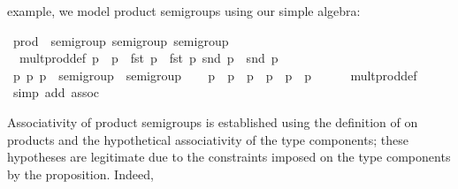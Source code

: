 \begin{isabellebody}
\begin{isamarkuptext}
  example, we model product semigroups using our simple algebra:%
\end{isamarkuptext}%
\isamarkuptrue%
%
\isadelimquote
%
\endisadelimquote
%
\isatagquote
{}\isamarkupfalse%
\ prod\ {\isacharcolon}{\isacharcolon}\ {\isacharparenleft}semigroup{\isacharcomma}\ semigroup{\isacharparenright}\ semigroup\isanewline
{}\isanewline
\isanewline
{}\isamarkupfalse%
\isanewline
\ \ mult{\isacharunderscore}prod{\isacharunderscore}def{\isacharcolon}\ {\isachardoublequoteopen}p\ {\isasymotimes}\ p\ {\isacharequal}\ {\isacharparenleft}fst\ p\ {\isasymotimes}\ fst\ p\ snd\ p\ {\isasymotimes}\ snd\ p\isanewline
\isanewline
{}\isamarkupfalse%
\ \isamarkupfalse%
\isanewline
\ \ \isamarkupfalse%
\ p\ p\ p\ {\isacharcolon}{\isacharcolon}\ {\isachardoublequoteopen}{\isasymalpha}{\isasymColon}semigroup\ {\isasymtimes}\ {\isasymbeta}{\isasymColon}semigroup{\isachardoublequoteclose}\isanewline
\ \ \isamarkupfalse%
\ {\isachardoublequoteopen}p\ {\isasymotimes}\ p\ {\isasymotimes}\ p\ {\isacharequal}\ p\ {\isasymotimes}\ {\isacharparenleft}p\ {\isasymotimes}\ p\isanewline
\ \ \ \ \isamarkupfalse%
\ mult{\isacharunderscore}prod{\isacharunderscore}def\ \isamarkupfalse%
\ {\isacharparenleft}simp\ add{\isacharcolon}\ assoc{\isacharparenright}\isanewline
{}\isamarkupfalse%
\ \ \ \ \ \ \isanewline
\isanewline
{}\isamarkupfalse%
%
\endisatagquote
{\isafoldquote}%
%
\isadelimquote
%
\endisadelimquote
%
\begin{isamarkuptext}%
\noindent Associativity of product semigroups is established using
  the definition of \isa{{\isacharparenleft}{\isasymotimes}{\isacharparenright}} on products and the hypothetical
  associativity of the type components; these hypotheses are
  legitimate due to the  constraints imposed on the
  type components by the \hyperlink{command.instance}{\mbox{}} proposition.  Indeed,

\end{isamarkuptext}
\end{isabellebody}
